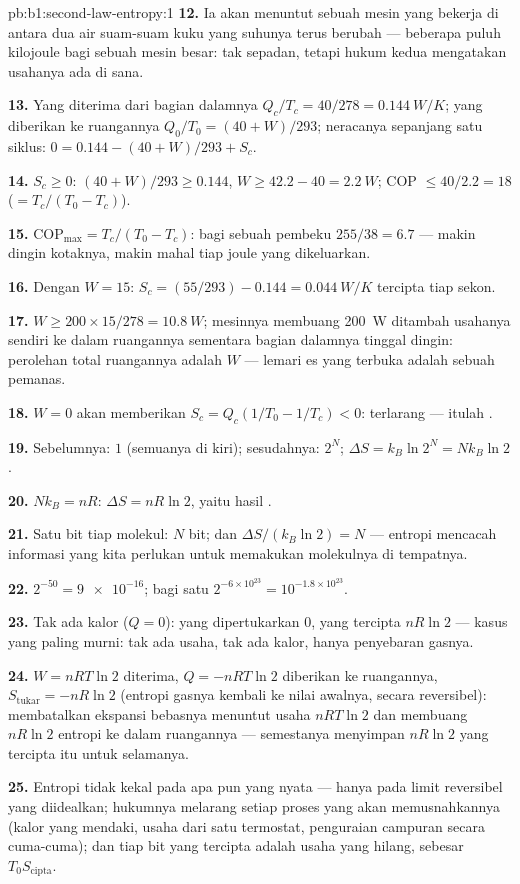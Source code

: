 \begin{solution}{pb:b1:second-law-entropy:1}
\textbf{12.} Ia akan menuntut sebuah mesin yang bekerja di antara dua air
suam-suam kuku yang suhunya terus berubah --- beberapa puluh kilojoule bagi
sebuah mesin besar: tak sepadan, tetapi hukum kedua mengatakan usahanya
ada di sana.

\textbf{13.} Yang diterima dari bagian dalamnya $Q_c/T_c = 40/278 = \qty{0.144}{W/K}$;
yang diberikan ke ruangannya $Q_0/T_0 = (40 + W)/293$; neracanya sepanjang satu siklus:
$0 = 0.144 - (40 + W)/293 + S_c$.

\textbf{14.} $S_c \geq 0$: $(40 + W)/293 \geq 0.144$, $W \geq 42.2 - 40 =
\qty{2.2}{W}$; COP $\leq 40/2.2 = 18$ ($= T_c/(T_0 - T_c)$).

\textbf{15.} $\mathrm{COP}_{\max} = T_c/(T_0 - T_c)$: bagi sebuah pembeku $255/38 = 6.7$
--- makin dingin kotaknya, makin mahal tiap joule yang dikeluarkan.

\textbf{16.} Dengan $W = 15$: $S_c = (55/293) - 0.144 = \qty{0.044}{W/K}$ tercipta
tiap sekon.

\textbf{17.} $W \geq 200 \times 15/278 = \qty{10.8}{W}$; mesinnya membuang
\qty{200}{W} ditambah usahanya sendiri ke dalam ruangannya sementara bagian dalamnya tinggal
dingin: perolehan total ruangannya adalah $W$ --- lemari es yang terbuka adalah sebuah pemanas.

\textbf{18.} $W = 0$ akan memberikan $S_c = Q_c(1/T_0 - 1/T_c) < 0$: terlarang ---
itulah .

\textbf{19.} Sebelumnya: $1$ (semuanya di kiri); sesudahnya: $2^N$; $\Delta S = k_B\ln2^N =
Nk_B\ln2$.

\textbf{20.} $Nk_B = nR$: $\Delta S = nR\ln2$, yaitu hasil .

\textbf{21.} Satu bit tiap molekul: $N$ bit; dan $\Delta S/(k_B\ln2) = N$ ---
entropi mencacah informasi yang kita perlukan untuk memakukan molekulnya
di tempatnya.

\textbf{22.} $2^{-50} = \num{9e-16}$; bagi satu  $2^{-6\times10^{23}} =
10^{-1.8\times10^{23}}$.

\textbf{23.} Tak ada kalor ($Q = 0$): yang dipertukarkan $0$, yang tercipta $nR\ln2$ ---
kasus yang paling murni: tak ada usaha, tak ada kalor, hanya penyebaran gasnya.

\textbf{24.} $W = nRT\ln2$ diterima, $Q = -nRT\ln2$ diberikan ke ruangannya,
$S_{\mathrm{tukar}} = -nR\ln2$ (entropi gasnya kembali ke nilai
awalnya, secara reversibel): membatalkan ekspansi bebasnya menuntut usaha $nRT\ln2$
dan membuang $nR\ln2$ entropi ke dalam ruangannya --- semestanya menyimpan
$nR\ln2$ yang tercipta itu untuk selamanya.

\textbf{25.} Entropi tidak kekal pada apa pun yang nyata --- hanya pada
limit reversibel yang diidealkan; hukumnya melarang setiap proses yang akan
memusnahkannya (kalor yang mendaki, usaha dari satu termostat, penguraian campuran secara cuma-cuma);
dan tiap bit yang tercipta adalah usaha yang hilang, sebesar $T_0S_{\mathrm{cipta}}$.
\end{solution}
